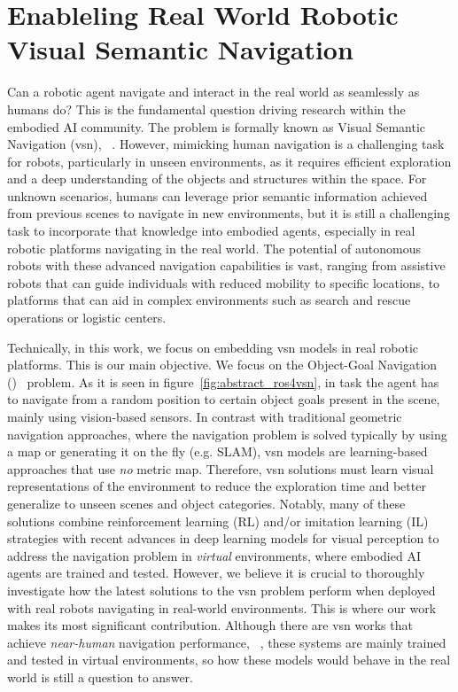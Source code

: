 \chapter{Enableling Real World Robotic Visual Semantic Navigation}\label{ch:ros4vsn:-enable-real-world-robotic-visual-semantic-navigation}

Can a robotic agent navigate and interact in the real world as seamlessly as humans do?
This is the fundamental question driving research within the embodied AI community.
The problem is formally known as Visual Semantic Navigation (\acrshort{vsn}), \eg~\cite{ramrakhya2023,Cai2024DGMemLV,chang2020}.
However, mimicking human navigation is a challenging task for robots, particularly in unseen environments, as it requires efficient exploration and a deep understanding of the objects and structures within the space.
For unknown scenarios, humans can leverage prior semantic information achieved from previous scenes to navigate in new environments, but it is still a challenging task to incorporate that knowledge into embodied agents, especially in real robotic platforms navigating in the real world.
The potential of autonomous robots with these advanced navigation capabilities is vast, ranging from assistive robots that can guide individuals with reduced mobility to specific locations, to platforms that can aid in complex environments such as search and rescue operations or logistic centers.

Technically, in this work, we focus on embedding \acrshort{vsn} models in real robotic platforms.
This is our main objective.
We focus on the Object-Goal Navigation (\objnav)~\cite{batra2020} problem.
As it is seen in figure~\ref{fig:abstract_ros4vsn}, in \objnav task the agent has to navigate from a random position to certain object goals present in the scene, mainly using vision-based sensors.
In contrast with traditional geometric navigation approaches, where the navigation problem is solved typically by using a map or generating it on the fly (e.g. SLAM), \acrshort{vsn} models are learning-based approaches that use \emph{no} metric map.
Therefore, \acrshort{vsn} solutions must learn visual representations of the environment to reduce the exploration time and better generalize to unseen scenes and object categories.
Notably, many of these solutions combine reinforcement learning (RL) and/or imitation learning (IL) strategies with recent advances in deep learning models for visual perception to address the navigation problem in \emph{virtual} environments, where embodied AI agents are trained and tested.
However, we believe it is crucial to thoroughly investigate how the latest solutions to the \acrshort{vsn} problem perform when deployed with real robots navigating in real-world environments.
This is where our work makes its most significant contribution.
Although there are \acrshort{vsn} works that achieve \textit{near-human} navigation performance, \eg~\cite{ramrakhya2023}, these systems are mainly trained and tested in virtual environments, so how these models would behave in the real world is still a question to answer.

